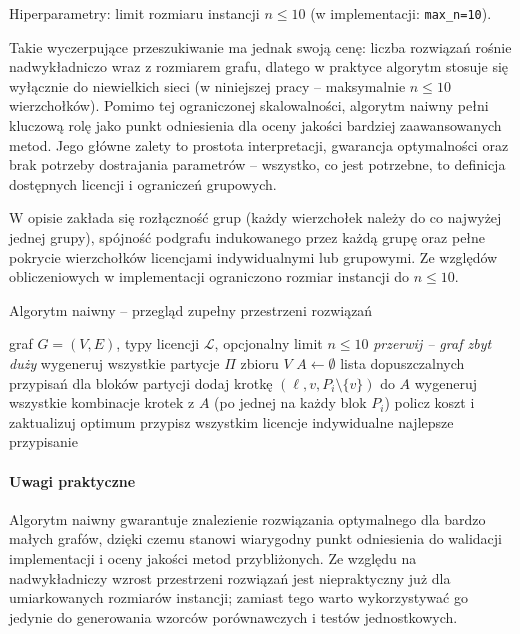 Hiperparametry: limit rozmiaru instancji $n\le 10$ (w implementacji: \texttt{max\_n=10}).

Takie wyczerpujące przeszukiwanie ma jednak swoją cenę: liczba rozwiązań rośnie nadwykładniczo wraz z rozmiarem grafu, dlatego w praktyce algorytm stosuje się wyłącznie do niewielkich sieci (w niniejszej pracy – maksymalnie $n\le10$ wierzchołków). Pomimo tej ograniczonej skalowalności, algorytm naiwny pełni kluczową rolę jako punkt odniesienia dla oceny jakości bardziej zaawansowanych metod. Jego główne zalety to prostota interpretacji, gwarancja optymalności oraz brak potrzeby dostrajania parametrów – wszystko, co jest potrzebne, to definicja dostępnych licencji i ograniczeń grupowych.

W opisie zakłada się rozłączność grup (każdy wierzchołek należy do co najwyżej jednej grupy), spójność podgrafu indukowanego przez każdą grupę oraz pełne pokrycie wierzchołków licencjami indywidualnymi lub grupowymi. Ze względów obliczeniowych w implementacji ograniczono rozmiar instancji do \(n\le10\).


\begin{algorithm}[H]
\caption{Algorytm naiwny – przegląd zupełny przestrzeni rozwiązań}
\label{alg:naive}
\begin{algorithmic}[1]
\Require graf \(G=(V,E)\), typy licencji \(\mathcal{L}\), opcjonalny limit \(n\le 10\)
 \State \Return \textit{przerwij – graf zbyt duży} \EndIf
\State wygeneruj wszystkie partycje \(\Pi\) zbioru \(V\)
  \State \(A\gets\emptyset\) \Comment lista dopuszczalnych przypisań dla bloków partycji
        \State dodaj krotkę \((\ell, v, P_i\setminus\{v\})\) do \(A\)
      \EndIf
    \EndFor
  \EndFor
  \State wygeneruj wszystkie kombinacje krotek z \(A\) (po jednej na każdy blok \(P_i\))
     \State policz koszt i zaktualizuj optimum \EndIf
  \EndFor
\EndFor
{} \State przypisz wszystkim licencje indywidualne \EndIf
\State \Return najlepsze przypisanie
\end{algorithmic}
\end{algorithm}

\paragraph{Uwagi praktyczne}
Algorytm naiwny gwarantuje znalezienie rozwiązania optymalnego dla bardzo małych grafów, dzięki czemu stanowi wiarygodny punkt odniesienia do walidacji implementacji i oceny jakości metod przybliżonych. Ze względu na nadwykładniczy wzrost przestrzeni rozwiązań jest niepraktyczny już dla umiarkowanych rozmiarów instancji; zamiast tego warto wykorzystywać go jedynie do generowania wzorców porównawczych i testów jednostkowych.

